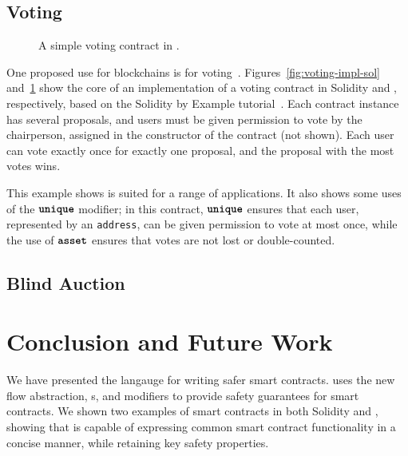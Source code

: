 \documentclass[nonacm, dvipsnames, sigconf]{acmart}
\begin{document}
\subsection{Voting}\label{sec:voting-impl}
\begin{figure}
    \centering
    
    \vspace{-1em}
    \caption{A simple voting contract in \langName.}
    \label{fig:voting-impl-flow}
\end{figure}
One proposed use for blockchains is for voting~\cite{Elsden18:Making}.
Figures~\ref{fig:voting-impl-sol} and~\ref{fig:voting-impl-flow} show the core of an implementation of a voting contract in Solidity and \langName, respectively, based on the Solidity by Example tutorial~\cite{solidityByExample}.
Each contract instance has several proposals, and users must be given permission to vote by the chairperson, assigned in the constructor of the contract (not shown).
Each user can vote exactly once for exactly one proposal, and the proposal with the most votes wins.

This example shows \langName is suited for a range of applications.
It also shows some uses of the $\textbf{\texttt{unique}}$ modifier; in this contract, $\textbf{\texttt{unique}}$ ensures that each user, represented by an \lstinline{address}, can be given permission to vote at most once, while the use of $\textbf{\texttt{asset}}$ ensures that votes are not lost or double-counted.


\subsection{Blind Auction}\label{sec:blind-auction-impl}
\begin{figure}
    \centering
    
    \vspace{-1em}
    \caption{}
    \label{fig:blind-auction-impl-flow}
\end{figure}

\section{Conclusion and Future Work}

We have presented the \langName langauge for writing safer smart contracts.
\langName uses the new flow abstraction, \assetTxt{}s, and modifiers to provide safety guarantees for smart contracts.
We shown two examples of smart contracts in both Solidity and \langName, showing that \langName is capable of expressing common smart contract functionality in a concise manner, while retaining key safety properties.
\end{document}
